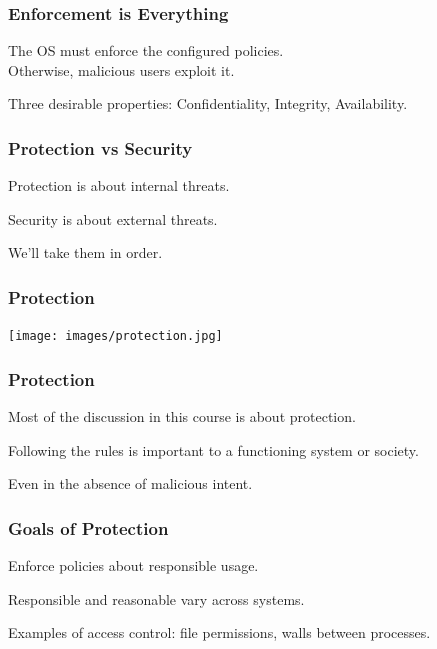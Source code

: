 \begin{frame}
\frametitle{Enforcement is Everything}

The OS must enforce the configured policies.\\
\quad Otherwise, malicious users exploit it.

Three desirable properties: Confidentiality, Integrity, Availability.

\end{frame}


\begin{frame}
\frametitle{Protection vs Security}

Protection is about internal threats.

Security is about external threats.

We'll take them in order.


\end{frame}


\begin{frame}
\frametitle{Protection}

\begin{center}
	\texttt{[image: images/protection.jpg]}
\end{center}


\end{frame}

\begin{frame}
\frametitle{Protection}

Most of the discussion in this course is about protection.

Following the rules is important to a functioning system or society.

Even in the absence of malicious intent.


\end{frame}


\begin{frame}
\frametitle{Goals of Protection}

Enforce policies about responsible usage.

Responsible and reasonable vary across systems.

Examples of access control: file permissions, walls between processes.

\end{frame}


